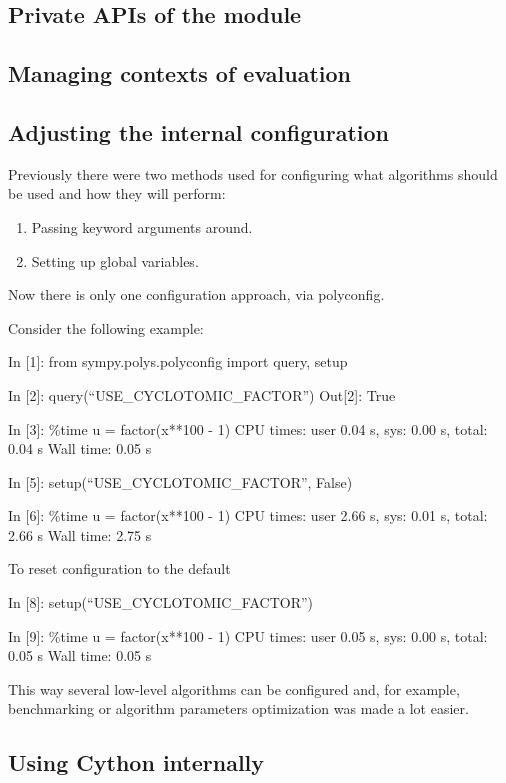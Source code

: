 \subsection{Private APIs of the module}


\subsection{Managing contexts of evaluation}


\subsection{Adjusting the internal configuration}

Previously there were two methods used for configuring what
algorithms should be used and how they will perform:
\begin{enumerate}
\item {}
Passing keyword arguments around.

\item {}
Setting up global variables.

\end{enumerate}

Now there is only one configuration approach, via polyconfig.

Consider the following example:

In {[}1{]}: from sympy.polys.polyconfig import query, setup

In {[}2{]}: query(``USE\_CYCLOTOMIC\_FACTOR'')
Out{[}2{]}: True

In {[}3{]}: \%time u = factor(x**100 - 1)
CPU times: user 0.04 s, sys: 0.00 s, total: 0.04 s
Wall time: 0.05 s

In {[}5{]}: setup(``USE\_CYCLOTOMIC\_FACTOR'', False)

In {[}6{]}: \%time u = factor(x**100 - 1)
CPU times: user 2.66 s, sys: 0.01 s, total: 2.66 s
Wall time: 2.75 s

To reset configuration to the default

In {[}8{]}: setup(``USE\_CYCLOTOMIC\_FACTOR'')

In {[}9{]}: \%time u = factor(x**100 - 1)
CPU times: user 0.05 s, sys: 0.00 s, total: 0.05 s
Wall time: 0.05 s

This way several low-level algorithms can be configured and, for
example, benchmarking or algorithm parameters optimization was
made a lot easier.
\hypertarget{thesis-cython}{}

\subsection{Using Cython internally}


